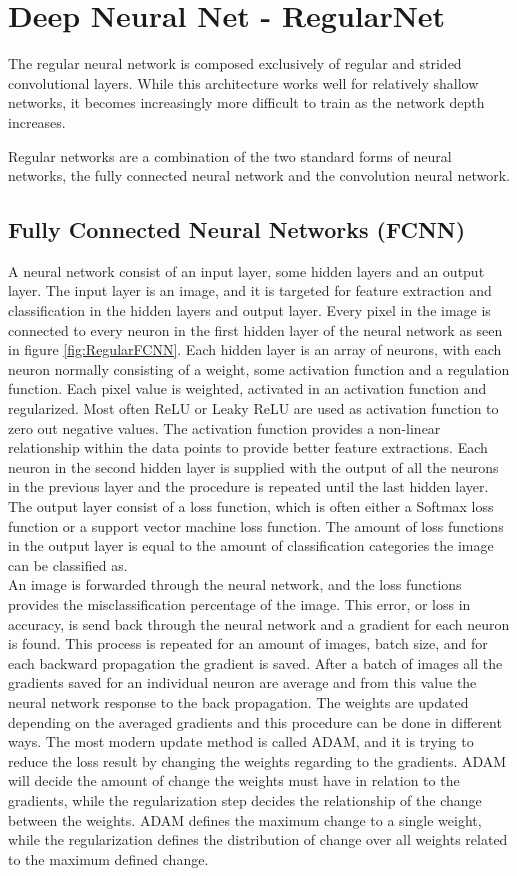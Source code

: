 \section{Deep Neural Net - RegularNet}
The regular neural network is composed exclusively of regular and strided convolutional layers. While this architecture works well for relatively shallow networks, it becomes increasingly more difficult to train as the network depth increases.

Regular networks are a combination of the two standard forms of neural networks, the fully connected neural network and the convolution neural network.

\subsection{Fully Connected Neural Networks (FCNN)}
A neural network consist of an input layer, some hidden layers and an output layer. The input layer is an image, and it is targeted for feature extraction and classification in the hidden layers and output layer. Every pixel in the image is connected to every neuron in the first hidden layer of the neural network as seen in figure \ref{fig:RegularFCNN}.    
Each hidden layer is an array of neurons, with each neuron normally consisting of a weight, some activation function and a regulation function. Each pixel value is weighted, activated in an activation function and regularized. Most often ReLU or Leaky ReLU are used as activation function to zero out negative values. The activation function provides a non-linear relationship within the data points to provide better feature extractions. Each neuron in the second hidden layer is supplied with the output of all the neurons in the previous layer and the procedure is repeated until the last hidden layer. The output layer consist of a loss function, which is often either a Softmax loss function or a support vector machine loss function. The amount of loss functions in the output layer is equal to the amount of classification categories the image can be classified as.
\\
An image is forwarded through the neural network, and the loss functions provides the misclassification percentage of the image. This error, or loss in accuracy, is send back through the neural network and a gradient for each neuron is found. This process is repeated for an amount of images, batch size, and for each backward propagation the gradient is saved. After a batch of images all the gradients saved for an individual neuron are average and from this value the neural network response to the back propagation. The weights are updated depending on the averaged gradients and this procedure can be done in different ways. The most modern update method is called ADAM, and it is trying to reduce the loss result by changing the weights regarding to the gradients. ADAM will decide the amount of change the weights must have in relation to the gradients, while the regularization step decides the relationship of the change between the weights. ADAM defines the maximum change to a single weight, while the regularization defines the distribution of change over all weights related to the maximum defined change.

